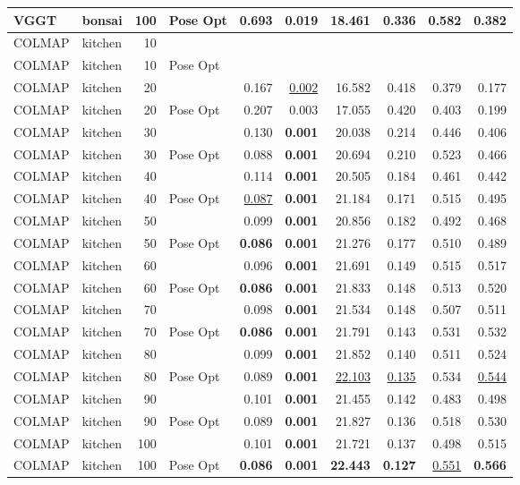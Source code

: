 \begin{table}[H]
\begin{tabular}{llrlrrrrrr}
VGGT & bonsai & 100 & Pose Opt & 0.693 & 0.019 & 18.461 & 0.336 & 0.582 & 0.382 \\
\midrule
COLMAP & kitchen & 10 &  &  &  &  &  &  &  \\
COLMAP & kitchen & 10 & Pose Opt &  &  &  &  &  &  \\
COLMAP & kitchen & 20 &  & 0.167 & \underline{0.002} & 16.582 & 0.418 & 0.379 & 0.177 \\
COLMAP & kitchen & 20 & Pose Opt & 0.207 & 0.003 & 17.055 & 0.420 & 0.403 & 0.199 \\
COLMAP & kitchen & 30 &  & 0.130 & \textbf{0.001} & 20.038 & 0.214 & 0.446 & 0.406 \\
COLMAP & kitchen & 30 & Pose Opt & 0.088 & \textbf{0.001} & 20.694 & 0.210 & 0.523 & 0.466 \\
COLMAP & kitchen & 40 &  & 0.114 & \textbf{0.001} & 20.505 & 0.184 & 0.461 & 0.442 \\
COLMAP & kitchen & 40 & Pose Opt & \underline{0.087} & \textbf{0.001} & 21.184 & 0.171 & 0.515 & 0.495 \\
COLMAP & kitchen & 50 &  & 0.099 & \textbf{0.001} & 20.856 & 0.182 & 0.492 & 0.468 \\
COLMAP & kitchen & 50 & Pose Opt & \textbf{0.086} & \textbf{0.001} & 21.276 & 0.177 & 0.510 & 0.489 \\
COLMAP & kitchen & 60 &  & 0.096 & \textbf{0.001} & 21.691 & 0.149 & 0.515 & 0.517 \\
COLMAP & kitchen & 60 & Pose Opt & \textbf{0.086} & \textbf{0.001} & 21.833 & 0.148 & 0.513 & 0.520 \\
COLMAP & kitchen & 70 &  & 0.098 & \textbf{0.001} & 21.534 & 0.148 & 0.507 & 0.511 \\
COLMAP & kitchen & 70 & Pose Opt & \textbf{0.086} & \textbf{0.001} & 21.791 & 0.143 & 0.531 & 0.532 \\
COLMAP & kitchen & 80 &  & 0.099 & \textbf{0.001} & 21.852 & 0.140 & 0.511 & 0.524 \\
COLMAP & kitchen & 80 & Pose Opt & 0.089 & \textbf{0.001} & \underline{22.103} & \underline{0.135} & 0.534 & \underline{0.544} \\
COLMAP & kitchen & 90 &  & 0.101 & \textbf{0.001} & 21.455 & 0.142 & 0.483 & 0.498 \\
COLMAP & kitchen & 90 & Pose Opt & 0.089 & \textbf{0.001} & 21.827 & 0.136 & 0.518 & 0.530 \\
COLMAP & kitchen & 100 &  & 0.101 & \textbf{0.001} & 21.721 & 0.137 & 0.498 & 0.515 \\
COLMAP & kitchen & 100 & Pose Opt & \textbf{0.086} & \textbf{0.001} & \textbf{22.443} & \textbf{0.127} & \underline{0.551} & \textbf{0.566} \\

\end{tabular}
\end{table}

